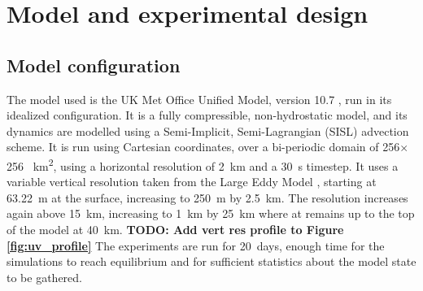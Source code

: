 \documentclass[11pt,a4paper]{article}
\newcommand\todo[1]{\textbf{TODO: #1}}
\begin{document}
\section{Model and experimental design}

\subsection{Model configuration}


The model used is the UK Met Office Unified Model, version 10.7 \parencite{walters2017met}, run in its idealized configuration. It is a fully compressible, non-hydrostatic model, and its dynamics are modelled using a Semi-Implicit, Semi-Lagrangian (SISL) advection scheme. It is run using Cartesian coordinates, over a bi-periodic domain of 256$\times$256 \SI{}{km^2}, using a horizontal resolution of \SI{2}{km} and a \SI{30}{s} timestep. It uses a variable vertical resolution taken from the Large Eddy Model \parencite{todocite}, starting at \SI{63.22}{m} at the surface, increasing to \SI{250}{m} by \SI{2.5}{km}. The resolution increases again above \SI{15}{km}, increasing to \SI{1}{km} by \SI{25}{km} where at remains up to the top of the model at \SI{40}{km}. \todo{Add vert res profile to Figure \ref{fig:uv_profile}}
The experiments are run for \SI{20}{days}, enough time for the simulations to reach equilibrium and for sufficient statistics about the model state to be gathered. 
\end{document}
